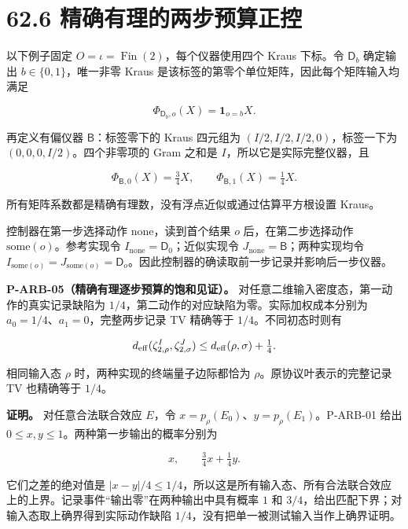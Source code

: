 \documentclass[
  11pt,
  oneside]{book}
\begin{document}
\hypertarget{ux7cbeux786eux6709ux7406ux7684ux4e24ux6b65ux9884ux7b97ux6b63ux63a7}{%
\section{62.6
精确有理的两步预算正控}\label{ux7cbeux786eux6709ux7406ux7684ux4e24ux6b65ux9884ux7b97ux6b63ux63a7}}

以下例子固定 \(O=\iota=\operatorname{Fin}(2)\)，每个仪器使用四个 Kraus
下标。令 \(\mathsf D_b\) 确定输出 \(b\in\{0,1\}\)，唯一非零 Kraus
是该标签的第零个单位矩阵，因此每个矩阵输入均满足

\[
\Phi_{\mathsf D_b,o}(X)=\mathbf1_{o=b}X.
\]

再定义有偏仪器 \(\mathsf B\)：标签零下的 Kraus 四元组为
\((I/2,I/2,I/2,0)\)，标签一下为 \((0,0,0,I/2)\)。四个非零项的 Gram
之和是 \(I\)，所以它是实际完整仪器，且

\[
\Phi_{\mathsf B,0}(X)=\tfrac34X,
\qquad \Phi_{\mathsf B,1}(X)=\tfrac14X.
\]

所有矩阵系数都是精确有理数，没有浮点近似或通过估算平方根设置 Kraus。

控制器在第一步选择动作 \(\mathrm{none}\)，读到首个结果 \(o\)
后，在第二步选择动作 \(\mathrm{some}(o)\)。参考实现令
\(I_{\mathrm{none}}=\mathsf D_0\)；近似实现令
\(J_{\mathrm{none}}=\mathsf B\)；两种实现均令
\(I_{\mathrm{some}(o)}=J_{\mathrm{some}(o)}=\mathsf D_o\)。因此控制器的确读取前一步记录并影响后一步仪器。

\protect\hypertarget{p-arb-05}{}{}

\textbf{P-ARB-05（精确有理逐步预算的饱和见证）。}
对任意二维输入密度态，第一动作的真实记录缺陷为
\(1/4\)，第二动作的对应缺陷为零。实际加权成本分别为
\(a_0=1/4\)、\(a_1=0\)，完整两步记录 TV 精确等于 \(1/4\)。不同初态时则有

\[
d_{\rm eff}(\zeta^I_{2,\rho},\zeta^J_{2,\sigma})
\le d_{\rm eff}(\rho,\sigma)+\tfrac14.
\]

相同输入态 \(\rho\) 时，两种实现的终端量子边际都恰为
\(\rho\)。原协议叶表示的完整记录 TV 也精确等于 \(1/4\)。

\textbf{证明。} 对任意合法联合效应 \(E\)，令
\(x=p_\rho(E_0)\)、\(y=p_\rho(E_1)\)。P-ARB-01 给出
\(0\le x,y\le1\)。两种第一步输出的概率分别为

\[
x,\qquad \tfrac34x+\tfrac14y.
\]

它们之差的绝对值是
\(|x-y|/4\le1/4\)，所以这是所有输入态、所有合法联合效应上的上界。记录事件``输出零''在两种输出中具有概率
\(1\) 和 \(3/4\)，给出匹配下界；对输入态取上确界得到实际动作缺陷
\(1/4\)，没有把单一被测试输入当作上确界证明。
\end{document}

